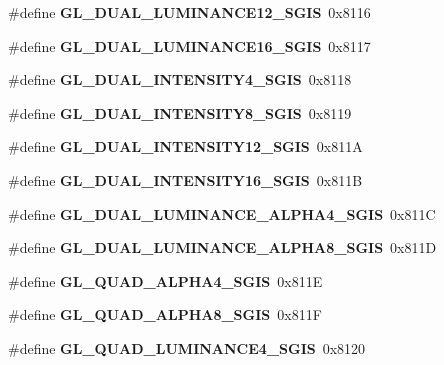 \begin{DoxyCompactItemize}
\item 
\#define {\bfseries G\+L\+\_\+\+D\+U\+A\+L\+\_\+\+L\+U\+M\+I\+N\+A\+N\+C\+E12\+\_\+\+S\+G\+I\+S}~0x8116\label{_s_d_l__opengl_8h_ad1740e35f626aba623c900cb2d2c0d14}

\item 
\#define {\bfseries G\+L\+\_\+\+D\+U\+A\+L\+\_\+\+L\+U\+M\+I\+N\+A\+N\+C\+E16\+\_\+\+S\+G\+I\+S}~0x8117\label{_s_d_l__opengl_8h_a336c2215e1bd389670ff5c3f745b8bf5}

\item 
\#define {\bfseries G\+L\+\_\+\+D\+U\+A\+L\+\_\+\+I\+N\+T\+E\+N\+S\+I\+T\+Y4\+\_\+\+S\+G\+I\+S}~0x8118\label{_s_d_l__opengl_8h_a6f2ead46cd2c84a11530c967beb34764}

\item 
\#define {\bfseries G\+L\+\_\+\+D\+U\+A\+L\+\_\+\+I\+N\+T\+E\+N\+S\+I\+T\+Y8\+\_\+\+S\+G\+I\+S}~0x8119\label{_s_d_l__opengl_8h_ae5bb423660152718c8600b2ffd2f213b}

\item 
\#define {\bfseries G\+L\+\_\+\+D\+U\+A\+L\+\_\+\+I\+N\+T\+E\+N\+S\+I\+T\+Y12\+\_\+\+S\+G\+I\+S}~0x811\+A\label{_s_d_l__opengl_8h_af96d55f87d0bb4bffc399125fe360c07}

\item 
\#define {\bfseries G\+L\+\_\+\+D\+U\+A\+L\+\_\+\+I\+N\+T\+E\+N\+S\+I\+T\+Y16\+\_\+\+S\+G\+I\+S}~0x811\+B\label{_s_d_l__opengl_8h_a50ef7fe948c2727b48420f8d7a9b3390}

\item 
\#define {\bfseries G\+L\+\_\+\+D\+U\+A\+L\+\_\+\+L\+U\+M\+I\+N\+A\+N\+C\+E\+\_\+\+A\+L\+P\+H\+A4\+\_\+\+S\+G\+I\+S}~0x811\+C\label{_s_d_l__opengl_8h_ae4af93aebf552f3115c01f3e98c61a60}

\item 
\#define {\bfseries G\+L\+\_\+\+D\+U\+A\+L\+\_\+\+L\+U\+M\+I\+N\+A\+N\+C\+E\+\_\+\+A\+L\+P\+H\+A8\+\_\+\+S\+G\+I\+S}~0x811\+D\label{_s_d_l__opengl_8h_aa69c0dd7c0e815bace817c8cceeb655a}

\item 
\#define {\bfseries G\+L\+\_\+\+Q\+U\+A\+D\+\_\+\+A\+L\+P\+H\+A4\+\_\+\+S\+G\+I\+S}~0x811\+E\label{_s_d_l__opengl_8h_ab228fbe51cc71bf9955341857a4d4886}

\item 
\#define {\bfseries G\+L\+\_\+\+Q\+U\+A\+D\+\_\+\+A\+L\+P\+H\+A8\+\_\+\+S\+G\+I\+S}~0x811\+F\label{_s_d_l__opengl_8h_ab9e996de1c73e73fa4eaf55d2b302ca3}

\item 
\#define {\bfseries G\+L\+\_\+\+Q\+U\+A\+D\+\_\+\+L\+U\+M\+I\+N\+A\+N\+C\+E4\+\_\+\+S\+G\+I\+S}~0x8120\label{_s_d_l__opengl_8h_add5b8be3177d7c3881b5baf571212ebb}


\end{DoxyCompactItemize}
